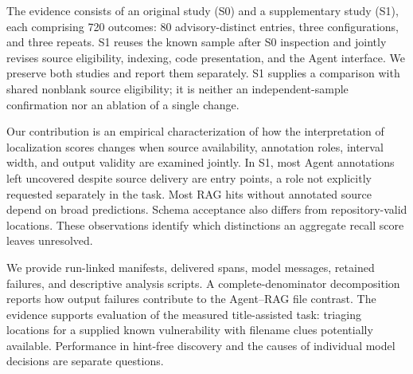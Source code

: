 The evidence consists of an original study (S0) and a supplementary study (S1), each comprising 720 outcomes: 80 advisory-distinct entries, three configurations, and three repeats. S1 reuses the known sample after S0 inspection and jointly revises source eligibility, indexing, code presentation, and the Agent interface. We preserve both studies and report them separately. S1 supplies a comparison with shared nonblank source eligibility; it is neither an independent-sample confirmation nor an ablation of a single change.

Our contribution is an empirical characterization of how the interpretation of localization scores changes when source availability, annotation roles, interval width, and output validity are examined jointly. In S1, most Agent annotations left uncovered despite source delivery are entry points, a role not explicitly requested separately in the task. Most RAG hits without annotated source depend on broad predictions. Schema acceptance also differs from repository-valid locations. These observations identify which distinctions an aggregate recall score leaves unresolved.

We provide run-linked manifests, delivered spans, model messages, retained failures, and descriptive analysis scripts. A complete-denominator decomposition reports how output failures contribute to the Agent--RAG file contrast. The evidence supports evaluation of the measured title-assisted task: triaging locations for a supplied known vulnerability with filename clues potentially available. Performance in hint-free discovery and the causes of individual model decisions are separate questions.
